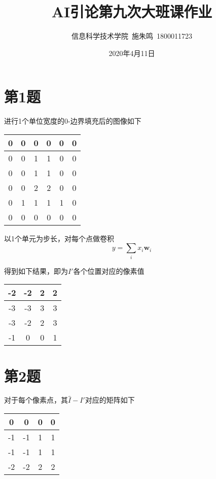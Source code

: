\documentclass[12pt,AutoFakeBold]{article}
\title{AI引论第九次大班课作业}
\author{信息科学技术学院\ 施朱鸣\ 1800011723}
\date{2020年4月11日}
\begin{document}
    \maketitle
    \section*{第1题}
    进行1个单位宽度的0-边界填充后的图像如下
    \begin{center}
        \begin{tabular}{|c|c|c|c|c|c|}
            \hline
            0&0&0&0&0&0\\
            \hline
            0&0&1&1&0&0\\
            \hline
            0&0&1&1&0&0\\
            \hline
            0&0&2&2&0&0\\
            \hline
            0&1&1&1&1&0\\
            \hline
            0&0&0&0&0&0\\
            \hline
        \end{tabular}
    \end{center}

    以1个单元为步长，对每个点做卷积
    \[y=\sum_i x_i\textbf{w}_i\]

    得到如下结果，即为\(I'\)各个位置对应的像素值
    \begin{center}
        \begin{tabular}{|c|c|c|c|}
            \hline
            -2&-2&2&2\\
            \hline
            -3&-3&3&3\\
            \hline
            -3&-2&2&3\\
            \hline
            -1&0&0&1\\
            \hline
        \end{tabular}
    \end{center}

    \section*{第2题}
    对于每个像素点，其\(\hat{I}-I'\)对应的矩阵如下

    \begin{center}
        \begin{tabular}{|c|c|c|c|}
            \hline
            0&0&0&0\\
            \hline
            -1&-1&1&1\\
            \hline
            -1&-1&1&1\\
            \hline
            -2&-2&2&2\\
            \hline
        \end{tabular}
    \end{center}
\end{document}
